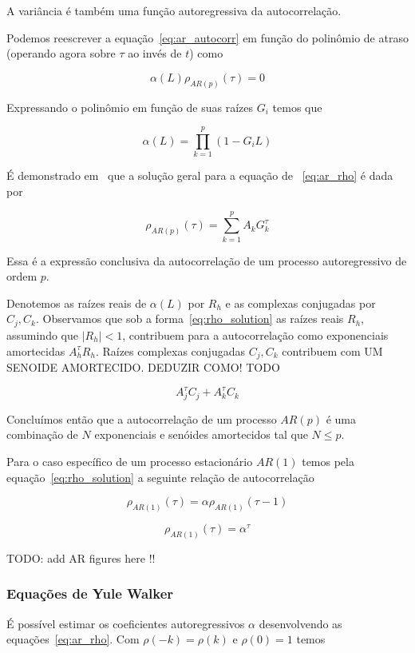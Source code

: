 A variância é também uma função autoregressiva da autocorrelação.

Podemos reescrever a equação~\ref{eq:ar_autocorr} em função do polinômio de
atraso (operando agora sobre $\tau$ ao invés de $t$) como

\begin{equation}\label{eq:ar_rho}
    \alpha(L)\rho_{AR(p)}(\tau) = 0
\end{equation}


Expressando o polinômio em função de suas raízes $G_i$ temos que

$$\alpha(L) = \prod_{k=1}^{p} (1 - G_i L)$$

É demonstrado em~\cite[capítulo~4]{box} que a solução geral para a equação de
~\ref{eq:ar_rho} é dada por

\begin{equation}\label{eq:rho_solution}
    \rho_{AR(p)}(\tau) = \sum_{k=1}^{p} A_k G^{\tau}_k
\end{equation}

Essa é a expressão conclusiva da autocorrelação de um processo autoregressivo
de ordem $p$.

Denotemos as raízes reais de $\alpha(L)$ por $R_h$ e as complexas conjugadas
por $C_j, C_k$. Observamos que sob a forma~\ref{eq:rho_solution} as raízes
reais $R_h$, assumindo que $|R_h| < 1$, contribuem para a autocorrelação como
exponenciais amortecidas $A_h^{\tau} R_h$. Raízes complexas conjugadas $C_j,
C_k$ contribuem com UM SENOIDE AMORTECIDO. DEDUZIR COMO!
TODO

$$ A_j^{\tau}C_j + A_k^{\tau}C_k $$

Concluímos então que a autocorrelação de um processo $AR(p)$ é uma combinação
de $N$ exponenciais e senóides amortecidos tal que $N \leq p$.

Para o caso específico de um processo estacionário $AR(1)$ temos pela
equação~\ref{eq:rho_solution} a seguinte relação de autocorrelação

$$ \rho_{AR(1)}(\tau) = \alpha \rho_{AR(1)}(\tau - 1)$$

$$ \rho_{AR(1)}(\tau) = \alpha^{\tau}$$

TODO: add AR figures here !!

\subsubsection{Equações de Yule Walker}

É possível estimar os coeficientes autoregressivos $\alpha$ desenvolvendo as
equações~\ref{eq:ar_rho}. Com $\rho(-k) = \rho(k)$ e $\rho(0) = 1$ temos

